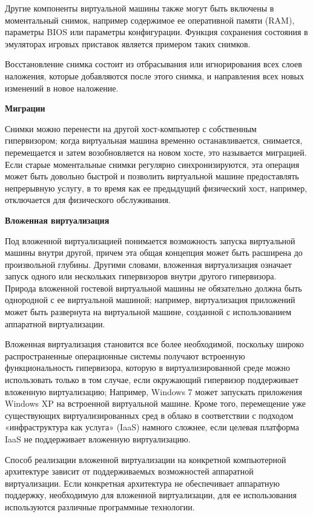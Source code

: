 Другие компоненты виртуальной машины также могут быть включены в моментальный снимок, например содержимое ее оперативной памяти (RAM), параметры BIOS или параметры конфигурации. Функция сохранения состояния в эмуляторах игровых приставок является примером таких снимков.


Восстановление снимка состоит из отбрасывания или игнорирования всех слоев наложения, которые добавляются после этого снимка, и направления всех новых изменений в новое наложение.


\textbf{Миграции}


Снимки можно перенести на другой хост-компьютер с собственным гипервизором; когда виртуальная машина временно останавливается, снимается, перемещается и затем возобновляется на новом хосте, это называется миграцией. Если старые моментальные снимки регулярно синхронизируются, эта операция может быть довольно быстрой и позволить виртуальной машине предоставлять непрерывную услугу, в то время как ее предыдущий физический хост, например, отключается для физического обслуживания.


\textbf{Вложенная виртуализация}


Под вложенной виртуализацией понимается возможность запуска виртуальной машины внутри другой, причем эта общая концепция может быть расширена до произвольной глубины. Другими словами, вложенная виртуализация означает запуск одного или нескольких гипервизоров внутри другого гипервизора. Природа вложенной гостевой виртуальной машины не обязательно должна быть однородной с ее виртуальной машиной; например, виртуализация приложений может быть развернута на виртуальной машине, созданной с использованием аппаратной виртуализации.

Вложенная виртуализация становится все более необходимой, поскольку широко распространенные операционные системы получают встроенную функциональность гипервизора, которую в виртуализированной среде можно использовать только в том случае, если окружающий гипервизор поддерживает вложенную виртуализацию; Например, Windows 7 может запускать приложения Windows XP на встроенной виртуальной машине. Кроме того, перемещение уже существующих виртуализированных сред в облако в соответствии с подходом «инфраструктура как услуга» (IaaS) намного сложнее, если целевая платформа IaaS не поддерживает вложенную виртуализацию.

Способ реализации вложенной виртуализации на конкретной компьютерной архитектуре зависит от поддерживаемых возможностей аппаратной виртуализации. Если конкретная архитектура не обеспечивает аппаратную поддержку, необходимую для вложенной виртуализации, для ее использования используются различные программные технологии.


